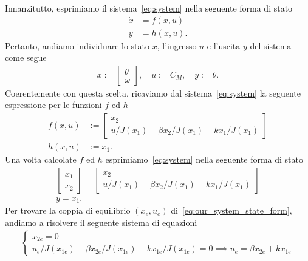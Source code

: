 \documentclass[a4paper, 11pt]{article}
\begin{document}
Innanzitutto, esprimiamo il sistema~\eqref{eq:system} nella seguente forma di stato
%
\begin{subequations}
\begin{align}\label{eq:state_form}
	\dot{x} &= f(x,u)
	\\
	y &= h(x,u).
\end{align}
\end{subequations}
%
Pertanto, andiamo individuare lo stato $x$, l'ingresso $u$ e l'uscita $y$ del sistema come segue 
%
\begin{align*}
	x := \begin{bmatrix}
		\theta \\
		\omega
	\end{bmatrix}, \quad u := C_M, \quad y := \theta.
\end{align*}
%
Coerentemente con questa scelta, ricaviamo dal sistema~\eqref{eq:system} la seguente espressione per le funzioni $f$ ed $h$
%
\begin{align*}
	f(x,u) &:= \begin{bmatrix}
		x_2 \\
		u/J(x_1)-\beta x_2 /J(x_1)- k x_1/J(x_1)
	\end{bmatrix}
	\\
	h(x,u) &:= x_1.
\end{align*}
%
Una volta calcolate $f$ ed $h$ esprimiamo~\eqref{eq:system} nella seguente forma di stato
%
\begin{subequations}\label{eq:our_system_state_form}
\begin{gather*}
	\begin{bmatrix}
		\dot{x}_1
		\\
		\dot{x_2}
	\end{bmatrix} = \begin{bmatrix}
	x_2 \\
	u/J(x_1)-\beta x_2 /J(x_1)- k x_1/J(x_1)
	\end{bmatrix} \label{eq:state_form_1}
	\\
	y = x_1.
\end{gather*}
\end{subequations}
%
Per trovare la coppia di equilibrio $(x_e, u_e)$ di~\eqref{eq:our_system_state_form}, andiamo a risolvere il seguente sistema di equazioni
%
\begin{align}
	\begin{cases}
		x_{2e} = 0 \\
		u_e/J(x_{1e})-\beta x_{2e} /J(x_{1e})- k x_{1e}/J(x_{1e})= 0 \implies u_e = \beta x_{2e} + k x_{1e}
	\end{cases}
\end{align}
\end{document}
